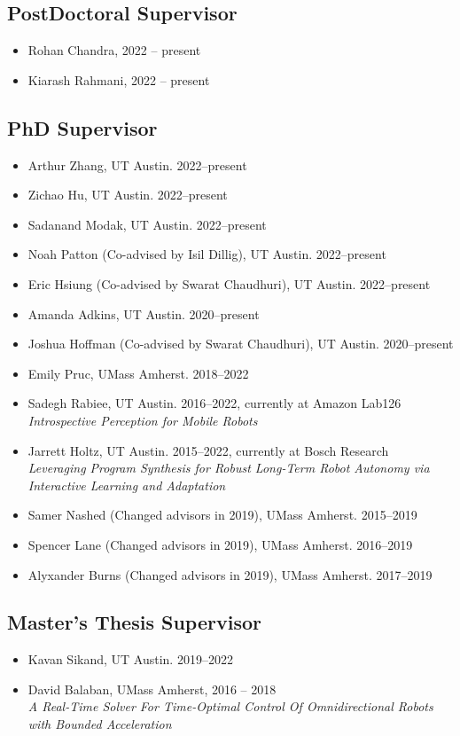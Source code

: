 \documentclass[Times]{article}
\begin{document}
\subsection*{PostDoctoral Supervisor}
\begin{itemize}
 \item Rohan Chandra, 2022 -- present
 \item Kiarash Rahmani, 2022 -- present
\end{itemize}

\subsection*{PhD Supervisor}
\begin{itemize}
  \item Arthur Zhang, UT Austin. 2022--present
  \item Zichao Hu, UT Austin. 2022--present
  \item Sadanand Modak, UT Austin. 2022--present
  \item Noah Patton (Co-advised by Isil Dillig), UT Austin. 2022--present
  \item Eric Hsiung (Co-advised by Swarat Chaudhuri), UT Austin. 2022--present
 \item Amanda Adkins, UT Austin. 2020--present
 \item Joshua Hoffman (Co-advised by Swarat Chaudhuri), UT Austin. 2020--present
 \item Emily Pruc, UMass Amherst. 2018--2022
 \item Sadegh Rabiee, UT Austin. 2016--2022, currently at Amazon Lab126 \\
 \emph{Introspective Perception for Mobile Robots}
 \item Jarrett Holtz, UT Austin. 2015--2022, currently at Bosch Research \\
 \emph{Leveraging Program Synthesis for Robust Long-Term Robot Autonomy via\\ Interactive Learning and Adaptation}
 \item Samer Nashed (Changed advisors in 2019), UMass Amherst. 2015--2019
 \item Spencer Lane (Changed advisors in 2019), UMass Amherst. 2016--2019
 \item Alyxander Burns (Changed advisors in 2019), UMass Amherst. 2017--2019
\end{itemize}

\subsection*{Master's Thesis Supervisor}
\begin{itemize}
 \item Kavan Sikand, UT Austin. 2019--2022
 \item David Balaban, UMass Amherst, 2016 -- 2018\\
 \emph{A Real-Time Solver For Time-Optimal Control Of Omnidirectional Robots with Bounded Acceleration}
\end{itemize}
\end{document}

